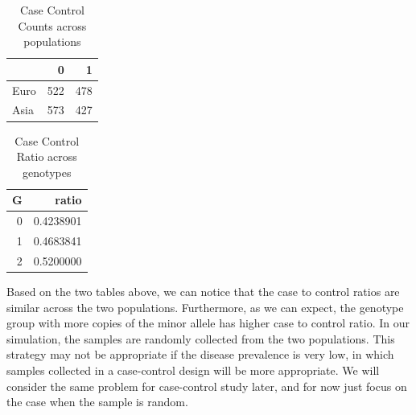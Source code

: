 \documentclass[
]{article}
\newenvironment{Shaded}{\begin{snugshade}}{\end{snugshade}}
\newcommand{\CommentTok}[1]{\textcolor[rgb]{0.56,0.35,0.01}{\textit{#1}}}
\newcommand{\DataTypeTok}[1]{\textcolor[rgb]{0.13,0.29,0.53}{#1}}
\newcommand{\DecValTok}[1]{\textcolor[rgb]{0.00,0.00,0.81}{#1}}
\newcommand{\KeywordTok}[1]{\textcolor[rgb]{0.13,0.29,0.53}{\textbf{#1}}}
\newcommand{\NormalTok}[1]{#1}
\newcommand{\OperatorTok}[1]{\textcolor[rgb]{0.81,0.36,0.00}{\textbf{#1}}}
\newcommand{\StringTok}[1]{\textcolor[rgb]{0.31,0.60,0.02}{#1}}
\begin{document}
\begin{table}[H]

\caption{\label{tab:simulatedData}Case Control Counts across populations}
\centering
\fontsize{10}{12}\selectfont
\begin{tabular}[t]{l|r|r}
\hline
  & 0 & 1\\
\hline
Euro & 522 & 478\\
\hline
Asia & 573 & 427\\
\hline
\end{tabular}
\end{table}

\begin{Shaded}
\end{Shaded}

\begin{table}[H]

\caption{\label{tab:simulatedData}Case Control Ratio across genotypes}
\centering
\fontsize{10}{12}\selectfont
\begin{tabular}[t]{r|r}
\hline
G & ratio\\
\hline
0 & 0.4238901\\
\hline
1 & 0.4683841\\
\hline
2 & 0.5200000\\
\hline
\end{tabular}
\end{table}

Based on the two tables above, we can notice that the case to control
ratios are similar across the two populations. Furthermore, as we can
expect, the genotype group with more copies of the minor allele has
higher case to control ratio. In our simulation, the samples are
randomly collected from the two populations. This strategy may not be
appropriate if the disease prevalence is very low, in which samples
collected in a case-control design will be more appropriate. We will
consider the same problem for case-control study later, and for now just
focus on the case when the sample is random.
\end{document}
